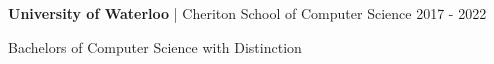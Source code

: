 


\begin{cventries}


\cventry
{\textbf{University of Waterloo} | Cheriton School of Computer Science}
{2017 - 2022}
{ %
\begin{cvitems}
\item {Bachelors of Computer Science with Distinction}
\end{cvitems}
}


\end{cventries}